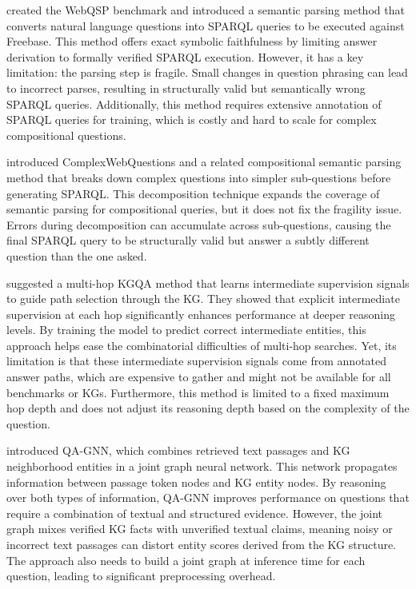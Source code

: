 \citet{yih2016websqp} created the WebQSP benchmark and introduced a semantic parsing method that converts natural language questions into SPARQL queries to be executed against Freebase. This method offers exact symbolic faithfulness by limiting answer derivation to formally verified SPARQL execution. However, it has a key limitation: the parsing step is fragile. Small changes in question phrasing can lead to incorrect parses, resulting in structurally valid but semantically wrong SPARQL queries. Additionally, this method requires extensive annotation of SPARQL queries for training, which is costly and hard to scale for complex compositional questions.

\citet{talmor2018cwq} introduced ComplexWebQuestions and a related compositional semantic parsing method that breaks down complex questions into simpler sub-questions before generating SPARQL. This decomposition technique expands the coverage of semantic parsing for compositional queries, but it does not fix the fragility issue. Errors during decomposition can accumulate across sub-questions, causing the final SPARQL query to be structurally valid but answer a subtly different question than the one asked.

\citet{he2021multihop} suggested a multi-hop KGQA method that learns intermediate supervision signals to guide path selection through the KG. They showed that explicit intermediate supervision at each hop significantly enhances performance at deeper reasoning levels. By training the model to predict correct intermediate entities, this approach helps ease the combinatorial difficulties of multi-hop searches. Yet, its limitation is that these intermediate supervision signals come from annotated answer paths, which are expensive to gather and might not be available for all benchmarks or KGs. Furthermore, this method is limited to a fixed maximum hop depth and does not adjust its reasoning depth based on the complexity of the question.

\citet{yasunaga2021qagnn} introduced QA-GNN, which combines retrieved text passages and KG neighborhood entities in a joint graph neural network. This network propagates information between passage token nodes and KG entity nodes. By reasoning over both types of information, QA-GNN improves performance on questions that require a combination of textual and structured evidence. However, the joint graph mixes verified KG facts with unverified textual claims, meaning noisy or incorrect text passages can distort entity scores derived from the KG structure. The approach also needs to build a joint graph at inference time for each question, leading to significant preprocessing overhead.

